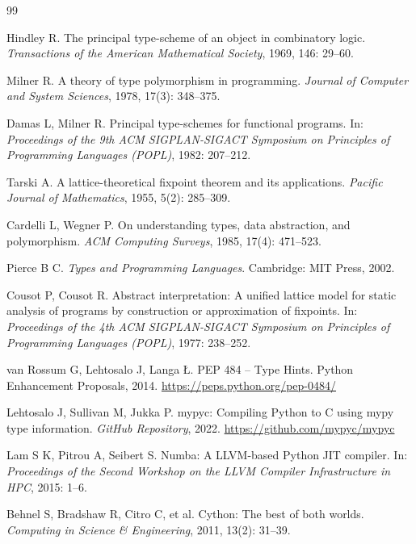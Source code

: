 \documentclass[UTF8]{article}
\begin{document}

\begin{thebibliography}{99}

Hindley R.
The principal type-scheme of an object in combinatory logic.
\textit{Transactions of the American Mathematical Society}, 1969, 146: 29--60.

Milner R.
A theory of type polymorphism in programming.
\textit{Journal of Computer and System Sciences}, 1978, 17(3): 348--375.

Damas L, Milner R.
Principal type-schemes for functional programs.
In: \textit{Proceedings of the 9th ACM SIGPLAN-SIGACT Symposium on Principles of Programming Languages (POPL)}, 1982: 207--212.

Tarski A.
A lattice-theoretical fixpoint theorem and its applications.
\textit{Pacific Journal of Mathematics}, 1955, 5(2): 285--309.

Cardelli L, Wegner P.
On understanding types, data abstraction, and polymorphism.
\textit{ACM Computing Surveys}, 1985, 17(4): 471--523.

Pierce B C.
\textit{Types and Programming Languages}.
Cambridge: MIT Press, 2002.

Cousot P, Cousot R.
Abstract interpretation: A unified lattice model for static analysis of programs by construction or approximation of fixpoints.
In: \textit{Proceedings of the 4th ACM SIGPLAN-SIGACT Symposium on Principles of Programming Languages (POPL)}, 1977: 238--252.

van Rossum G, Lehtosalo J, Langa Ł.
PEP 484 -- Type Hints.
Python Enhancement Proposals, 2014.
\url{https://peps.python.org/pep-0484/}

Lehtosalo J, Sullivan M, Jukka P.
mypyc: Compiling Python to C using mypy type information.
\textit{GitHub Repository}, 2022.
\url{https://github.com/mypyc/mypyc}

Lam S K, Pitrou A, Seibert S.
Numba: A LLVM-based Python JIT compiler.
In: \textit{Proceedings of the Second Workshop on the LLVM Compiler Infrastructure in HPC}, 2015: 1--6.

Behnel S, Bradshaw R, Citro C, et al.
Cython: The best of both worlds.
\textit{Computing in Science \& Engineering}, 2011, 13(2): 31--39.


\end{thebibliography}
\end{document}
